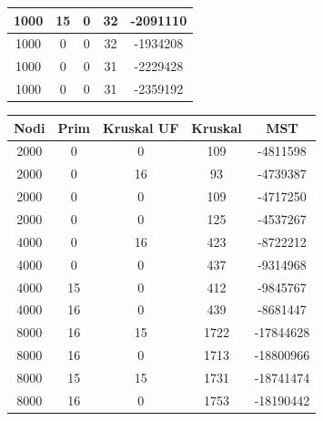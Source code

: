 \documentclass[a4paper]{article}
\begin{document}
\begin{table}[]
\begin{minipage}[b]{10cm}
\begin{tabular}{|c|c|c|c|c|}
      1000          & 15            & 0                   & 32               & -2091110     \\ \hline
      1000          & 0             & 0                   & 32               & -1934208     \\ \hline
      1000          & 0             & 0                   & 31               & -2229428     \\ \hline
      1000          & 0             & 0                   & 31               & -2359192     \\ \hline
    \end{tabular}
  \end{minipage}
  \begin{minipage}[b]{10cm}
    \begin{tabular}{|c|c|c|c|c|}
      \hline
      \rowcolor{gray!50}
      \textbf{Nodi} & \textbf{Prim} & \textbf{Kruskal UF} & \textbf{Kruskal} & \textbf{MST} \\ \hline
      2000          & 0             & 0                   & 109              & -4811598     \\ \hline
      2000          & 0             & 16                  & 93               & -4739387     \\ \hline
      2000          & 0             & 0                   & 109              & -4717250     \\ \hline
      2000          & 0             & 0                   & 125              & -4537267     \\ \hline
      4000          & 0             & 16                  & 423              & -8722212     \\ \hline
      4000          & 0             & 0                   & 437              & -9314968     \\ \hline
      4000          & 15            & 0                   & 412              & -9845767     \\ \hline
      4000          & 16            & 0                   & 439              & -8681447     \\ \hline
      8000          & 16            & 15                  & 1722             & -17844628    \\ \hline
      8000          & 16            & 0                   & 1713             & -18800966    \\ \hline
      8000          & 15            & 15                  & 1731             & -18741474    \\ \hline
      8000          & 16            & 0                   & 1753             & -18190442    \\ \hline

\end{tabular}
\end{minipage}
\end{table}
\end{document}
